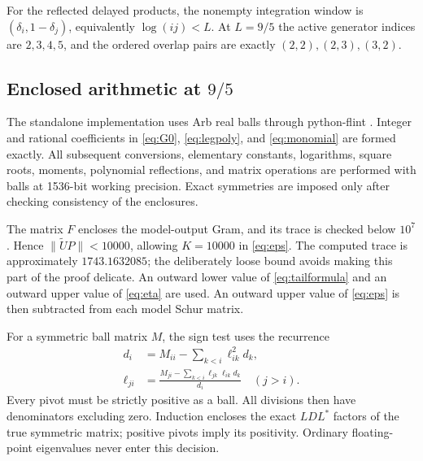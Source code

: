 \documentclass[11pt]{article}
\numberwithin{equation}{section}
\theoremstyle{definition}
\theoremstyle{remark}
\newcommand{\norm}[1]{\lVert#1\rVert}
\begin{document}
For the reflected delayed products, the nonempty integration window is
$(\delta_i,1-\delta_j)$, equivalently $\log(ij)<L$.
At $L=9/5$ the active generator indices are $2,3,4,5$, and the ordered
overlap pairs are exactly $(2,2),(2,3),(3,2)$.

\subsection{Enclosed arithmetic at \texorpdfstring{$9/5$}{9/5}}

The standalone implementation uses Arb real balls \cite{Johansson2017}
through python-flint \cite{PythonFlint}. Integer and rational coefficients
in \eqref{eq:G0}, \eqref{eq:legpoly}, and \eqref{eq:monomial} are formed
exactly. All subsequent conversions, elementary constants, logarithms,
square roots, moments, polynomial reflections, and matrix operations are
performed with balls at 1536-bit working precision. Exact symmetries are
imposed only after checking consistency of the enclosures.

The matrix $F$ encloses the model-output Gram, and its trace is checked
below $10^7$. Hence $\norm{\widetilde UP}<10000$, allowing $K=10000$
in \eqref{eq:eps}. The computed trace is approximately $1743.1632085$;
the deliberately loose bound avoids making this part of the proof delicate.
An outward lower value of \eqref{eq:tailformula} and an outward upper value
of \eqref{eq:eta} are used. An outward upper value of \eqref{eq:eps} is
then subtracted from each model Schur matrix.

For a symmetric ball matrix $M$, the sign test uses the recurrence
\begin{align*}
 d_i&=M_{ii}-\sum_{k<i}\ell_{ik}^2d_k,\\
 \ell_{ji}&=\frac{M_{ji}-\sum_{k<i}\ell_{jk}\ell_{ik}d_k}{d_i}\quad(j>i).
\end{align*}
Every pivot must be strictly positive as a ball. All divisions then have
denominators excluding zero. Induction encloses the exact $LDL^*$ factors
of the true symmetric matrix; positive pivots imply its positivity.
Ordinary floating-point eigenvalues never enter this decision.
\end{document}
